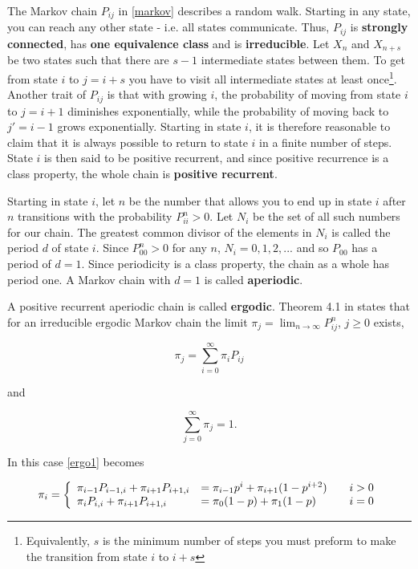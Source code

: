 The Markov chain $P_{ij}$ in \cref{markov} describes a random walk. Starting in any state, you can reach any other state - i.e. all states communicate. 
Thus, $P_{ij}$ is \textbf{strongly connected}, has \textbf{one equivalence class} and is \textbf{irreducible}. 
Let $X_n$ and $X_{n+s}$ be two states such that there are $s-1$ intermediate states between them. 
To get from state $i$ to $j=i+s$ you have to visit all intermediate states at least once\footnote{Equivalently, $s$ is the minimum number of steps you must preform to make the transition from state $i$ to $i+s$}. 
Another trait of $P_{ij}$ is that with growing $i$, the probability of moving from state $i$ to $j=i+1$ diminishes exponentially, while the probability of moving back to $j'=i-1$ grows exponentially. 
Starting in state $i$, it is therefore reasonable to claim that it is always possible to return to state $i$ in a finite number of steps.
State $i$ is then said to be positive recurrent, and since positive recurrence is a class property, the whole chain is \textbf{positive recurrent}.

Starting in state $i$, let $n$ be the number that allows you to end up in state $i$ after $n$ transitions with the probability $P^{n}_{ii} > 0$. 
Let $N_i$ be the set of all such numbers for our chain. 
The greatest common divisor of the elements in $N_i$ is called the period $d$ of  state $i$.
Since $P^{n}_{00} > 0$ for any $n$, $N_i = 0, 1, 2, ...$ and so $P_{00}$ has a period of $d=1$. Since periodicity is a class property, the chain as a whole has period one. 
A Markov chain with $d=1$ is called \textbf{aperiodic}.

A positive recurrent aperiodic chain is called \textbf{ergodic}. 
Theorem 4.1 in \cite{ross} states that for an irreducible ergodic Markov chain the limit $\pi_j = \lim_{n \to \infty}P^n_{ij}$, $j \geq 0$ exists, 

\begin{equation}
\label{ergo1}
 \pi_{j} = \sum^{\infty}_{i = 0} \pi_{i} P_{ij}
\end{equation}

and 

\begin{equation}
\label{ergo2}
 \sum^{\infty}_{j = 0} \pi_{j} = 1.
\end{equation}

In this case \cref{ergo1} becomes

\begin{align}
\label{pi_i}
  \pi_{i} = \left\{ 
  \begin{array}{l l l}
    \pi_{i-1} P_{i-1,i} + \pi_{i+1} P_{i+1,i} &= \pi_{i-1} p^i + \pi_{i+1} (1-p^{i+2}) & \quad i>0\\
    \pi_{i} P_{i,i} + \pi_{i+1} P_{i+1,i} &= \pi_{0}(1-p) + \pi_{1}(1-p) & \quad i=0\\
  \end{array} \right.
\end{align}

